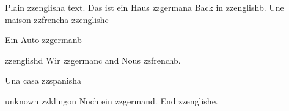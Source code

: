 Plain zzenglisha text.
\foreignlanguage{ngerman}{Das ist ein Haus zzgermana}
Back in zzenglishb.
{ Une maison zzfrencha} zzenglishc
\begin{otherlanguage}{german}Ein Auto zzgermanb\end{otherlanguage} zzenglishd
\textgerman{Wir zzgermanc} and \textfrench{Nous zzfrenchb}.
\begin{spanish}Una casa zzspanisha\end{spanish}
\foreignlanguage{klingon}{unknown zzklingon}
Noch ein zzgermand.
End zzenglishe.
